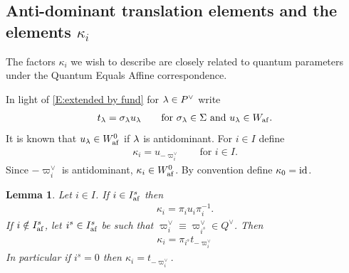 \documentclass[a4paper]{amsart}
\newcommand{\ike}[1]{\todo[size=\tiny,color=blue!30]{#1}}
\newcommand{\smark}[1]{\todo[size=\tiny,color=cyan!30]{#1}}
\newtheorem{lem}[thm]{Lemma}
\theoremstyle{remark}
\numberwithin{equation}{section}
\begin{document}


\subsection{Anti-dominant translation elements and the elements $\kappa_i$}



The factors $\kappa_i$ we wish to describe are closely related to 
quantum parameters under the Quantum Equals Affine correspondence.

In light of \eqref{E:extended by fund} for $\lambda\in P^\lor$ write 
\begin{align}\label{E:translation auto affine}
t_\lambda = \sigma_\lambda u_\lambda\qquad\text{for $\sigma_\lambda\in\Sigma$ and $u_\lambda\in W_{\mathrm{af}}$.}
\end{align}
It is known \cite[Lemma 2.33]{ISY} that $u_\lambda\in W_{\mathrm{af}}^0$ if $\lambda$ is antidominant.
For $i\in I$ define 
\begin{align}\label{E:kappa}
  \kappa_i = u_{-\varpi_i^\lor}\qquad\text{for $i\in I$.}
\end{align} 
Since $-\varpi_i^\vee$ is antidominant, $\kappa_i\in W_{\mathrm{af}}^0$. By convention define $\kappa_0=\mathrm{id}$.

\begin{lem} \label{L:kappa}
Let $i\in I$. 
If $i\in I_{\mathrm{af}}^s$ then \cite[Prop. 2.34]{ISY}
\begin{align}\label{E:kappa special}
\kappa_i = \pi_i u_i \pi_i^{-1}.
\end{align}
If $i\notin I_{\mathrm{af}}^s$, let $i^s\in I_{\mathrm{af}}^s$ be such that $
\varpi_i^\vee \equiv \varpi_{i^s}^\vee\in Q^\vee$. Then \cite[(2.67)]{ISY}
\begin{align}\label{E:kappa i}
\kappa_i =
\pi_{i^s} t_{-\varpi_i^\vee}
\end{align}
In particular if $i^s=0$ then $\kappa_i = t_{-\varpi_i^\vee}$.
\end{lem}
\end{document}

